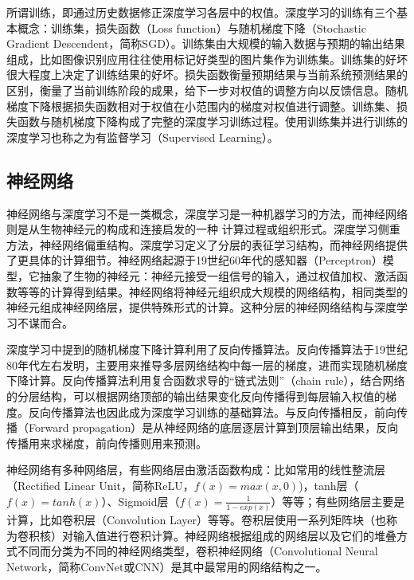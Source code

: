 所谓训练，即通过历史数据修正深度学习各层中的权值。深度学习的训练有三个基本概念：训练集，损失函数（Loss function）与随机梯度下降（Stochastic Gradient Descendent，简称SGD）。训练集由大规模的输入数据与预期的输出结果组成，比如图像识别应用往往使用标记好类型的图片集作为训练集。训练集的好坏很大程度上决定了训练结果的好坏。损失函数衡量预期结果与当前系统预测结果的区别，衡量了当前训练阶段的成果，给下一步对权值的调整方向以反馈信息。随机梯度下降根据损失函数相对于权值在小范围内的梯度对权值进行调整。训练集、损失函数与随机梯度下降构成了完整的深度学习训练过程。使用训练集并进行训练的深度学习也称之为有监督学习（Supervised Learning）。

\subsection{神经网络}

神经网络与深度学习不是一类概念，深度学习是一种机器学习的方法，而神经网络则是从生物神经元的构成和连接启发的一种
计算过程或组织形式。深度学习侧重方法，神经网络偏重结构。深度学习定义了分层的表征学习结构，而神经网络提供了更具体的计算细节。神经网络起源于19世纪60年代的感知器（Perceptron）模型，它抽象了生物的神经元：神经元接受一组信号的输入，通过权值加权、激活函数等等的计算得到结果。神经网络将神经元组织成大规模的网络结构，相同类型的神经元组成神经网络层，提供特殊形式的计算。这种分层的神经网络结构与深度学习不谋而合。

深度学习中提到的随机梯度下降计算利用了反向传播算法。反向传播算法于19世纪80年代左右发明，主要用来推导多层网络结构中每一层的梯度，进而实现随机梯度下降计算。反向传播算法利用复合函数求导的“链式法则”（chain rule），结合网络的分层结构，可以根据网络顶部的输出结果变化反向传播得到每层输入权值的梯度。反向传播算法也因此成为深度学习训练的基础算法。与反向传播相反，前向传播（Forward propagation）是从神经网络的底层逐层计算到顶层输出结果，反向传播用来求梯度，前向传播则用来预测。

神经网络有多种网络层，有些网络层由激活函数构成：比如常用的线性整流层（Rectified Linear Unit，简称ReLU，$f(x)=max(x,0)$)，tanh层（$f(x)=tanh(x)$）、Sigmoid层（$f(x)=\frac{1}{1-exp(x)}$）等等；有些网络层主要是计算，比如卷积层（Convolution Layer）等等。卷积层使用一系列矩阵块（也称为卷积核）对输入值进行卷积计算。神经网络根据组成的网络层以及它们的堆叠方式不同而分类为不同的神经网络类型，卷积神经网络（Convolutional Neural Network，简称ConvNet或CNN）是其中最常用的网络结构之一。

